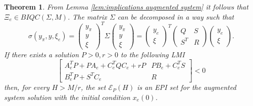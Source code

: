 \documentclass[letterpaper,10pt,conference,twocolumn]{IEEEtran}
\newtheorem{thm}{Theorem}[section]
\newcommand{\csi}{\xi}
\newcommand{\ellips}{\mathcal{E}}
\begin{document}
\begin{thm}
	From Lemma \ref{lem:implications augmented system} it follows that $\Xi_e \in BIQC(\Sigma,M)$.
	The matrix $\Sigma$ can be decomposed in a way such that
	\begin{equation*}
		\sigma(y_{\pi}, y,\csi_e)=
		\left(\begin{array}{c}
			y_{\pi}\\
			y\\
			\csi
		\end{array}\right)^T
		\Sigma
		\left(\begin{array}{c}
			y_{\pi}\\
			y\\
			\csi
		\end{array}\right)=
		\left(\begin{array}{c}
			y_e\\
			\csi
		\end{array}\right)^T
		\left(
			\begin{array}{cc}
				Q	& S \\
				S^T	& R
			\end{array}
		\right)
		\left(\begin{array}{c}
			y_e\\
			\csi
		\end{array}\right).
	\end{equation*}
	If there exists a solution $P>0, r>0$ to the following LMI
	\begin{equation}\label{eq:LMIextended}
		\left[
			\begin{array}{cc}
				A_e^TP+PA_e+C_e^TQC_e+rP	& PB_e+C_e^TS \\
				B_e^TP+S^TC_e			& R
			\end{array}
		\right] < 0
	\end{equation}
	then, for every $H>M/r$, the set $\ellips_P(H)$ is an EPI set for the augmented system solution with the initial condition $x_e(0)$.
\end{thm}
\end{document}
